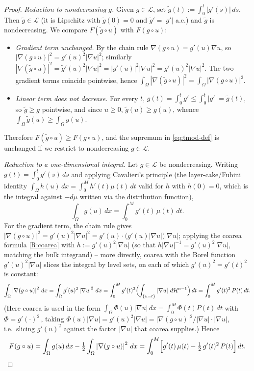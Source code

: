\documentclass[11pt]{amsart}
\theoremstyle{definition}
\newcommand{\Om}{\Omega}
\newcommand{\abs}[1]{\left|#1\right|}
\newcommand{\dx}{\,dx}
\newcommand{\dt}{\,dt}
\newcommand{\dH}{\,d\mathcal H^{n-1}}
\begin{document}
\begin{proof}
\emph{Reduction to nondecreasing $g$.} Given $g\in\mathcal L$, set
$\tilde g(t):=\int_0^t\abs{g'(s)}\,ds$. Then $\tilde g\in\mathcal L$ (it is
Lipschitz with $\tilde g(0)=0$ and $\tilde g'=\abs{g'}$ a.e.) and
$\tilde g$ is nondecreasing. We compare $F(\tilde g\circ u)$ with
$F(g\circ u)$:
\begin{itemize}
\item \emph{Gradient term unchanged.} By the chain rule
$\nabla(g\circ u)=g'(u)\nabla u$, so $\abs{\nabla(g\circ u)}^2
=g'(u)^2\abs{\nabla u}^2$; similarly $\abs{\nabla(\tilde g\circ u)}^2
=\tilde g'(u)^2\abs{\nabla u}^2=\abs{g'(u)}^2\abs{\nabla u}^2
=g'(u)^2\abs{\nabla u}^2$. The two gradient terms coincide pointwise, hence
$\int_\Om\abs{\nabla(\tilde g\circ u)}^2=\int_\Om\abs{\nabla(g\circ u)}^2$.
\item \emph{Linear term does not decrease.} For every $t$,
$g(t)=\int_0^t g'\le\int_0^t\abs{g'}=\tilde g(t)$, so $\tilde g\ge g$
pointwise, and since $u\ge0$, $\tilde g(u)\ge g(u)$, whence
$\int_\Om\tilde g(u)\ge\int_\Om g(u)$.
\end{itemize}
Therefore $F(\tilde g\circ u)\ge F(g\circ u)$, and the supremum in
\eqref{eq:tmod-def} is unchanged if we restrict to nondecreasing
$g\in\mathcal L$.

\emph{Reduction to a one-dimensional integral.} Let $g\in\mathcal L$ be
nondecreasing. Writing $g(t)=\int_0^t g'(s)\,ds$ and applying Cavalieri's
principle (the layer-cake/Fubini identity
$\int_\Om h(u)\dx=\int_0^M h'(t)\mu(t)\dt$ valid for $h$ with $h(0)=0$,
which is the integral against $-d\mu$ written via the distribution
function),
\[
  \int_\Om g(u)\dx=\int_0^M g'(t)\,\mu(t)\dt .
\]
For the gradient term, the chain rule gives $\abs{\nabla(g\circ u)}^2
=g'(u)^2\abs{\nabla u}^2=g'(u)\cdot\bigl(g'(u)\abs{\nabla u}\bigr)
\abs{\nabla u}$; applying the coarea formula \ref{R:coarea} with
$h:=g'(u)^2\abs{\nabla u}$ (so that $h\abs{\nabla u}^{-1}=g'(u)^2\abs{\nabla
u}$, matching the bulk integrand) -- more directly, coarea with the Borel
function $g'(u)^2\abs{\nabla u}$ slices the integral by level sets, on each
of which $g'(u)^2=g'(t)^2$ is constant:
\[
  \int_\Om\abs{\nabla(g\circ u)}^2\dx
  =\int_\Om g'(u)^2\abs{\nabla u}^2\dx
  =\int_0^M g'(t)^2\Bigl(\int_{\{u=t\}}\abs{\nabla u}\dH\Bigr)\dt
  =\int_0^M g'(t)^2\,P(t)\dt .
\]
(Here coarea is used in the form $\int_\Om\Phi(u)\abs{\nabla u}\dx
=\int_0^M\Phi(t)P(t)\dt$ with $\Phi=g'(\cdot)^2\,$, taking
$\Phi(u)\abs{\nabla u}=g'(u)^2\abs{\nabla u}=\abs{\nabla(g\circ
u)}^2/\abs{\nabla u}\cdot\abs{\nabla u}$, i.e.\ slicing $g'(u)^2$ against the
factor $\abs{\nabla u}$ that coarea supplies.) Hence
\[
  F(g\circ u)=\int_\Om g(u)\dx-\tfrac12\int_\Om\abs{\nabla(g\circ u)}^2\dx
  =\int_0^M\Bigl[g'(t)\,\mu(t)-\tfrac12\,g'(t)^2\,P(t)\Bigr]\dt .
\]


\end{proof}
\end{document}
